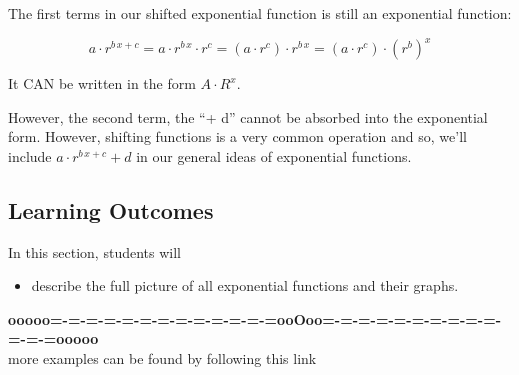 \documentclass{ximera}
\begin{document}
The first terms in our shifted exponential function is still an exponential function:

\[
a \cdot r^{b \, x + c} = a \cdot r^{b \, x} \cdot  r^c = (a \cdot r^c) \cdot r^{b \, x} = (a \cdot r^c) \cdot (r^b)^x 
\]

It CAN be written in the form $A \cdot R^x$.


However, the second term, the ``+ d'' cannot be absorbed into the exponential form.  However, shifting functions is a very common operation and so, we'll include $a \cdot r^{b \, x + c} + d$ in our general ideas of exponential functions.





\subsection{Learning Outcomes}


\begin{sectionOutcomes}
In this section, students will 

\begin{itemize}
\item describe the full picture of all exponential functions and their graphs.
\end{itemize}
\end{sectionOutcomes}












\begin{center}
\textbf{\textcolor{green!50!black}{ooooo=-=-=-=-=-=-=-=-=-=-=-=-=ooOoo=-=-=-=-=-=-=-=-=-=-=-=-=ooooo}} \\

more examples can be found by following this link\\ 

\end{center}
\end{document}
